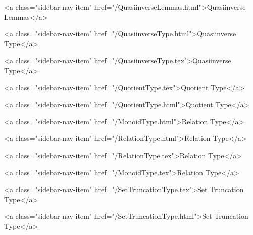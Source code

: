       
    
      
        
          <a class="sidebar-nav-item" href="/QuasiinverseLemmas.html">Quasiinverse Lemmas</a>
        
      
    
      
        
          <a class="sidebar-nav-item" href="/QuasiinverseType.html">Quasiinverse Type</a>
        
      
    
      
        
          <a class="sidebar-nav-item" href="/QuasiinverseType.tex">Quasiinverse Type</a>
        
      
    
      
        
          <a class="sidebar-nav-item" href="/QuotientType.tex">Quotient Type</a>
        
      
    
      
        
          <a class="sidebar-nav-item" href="/QuotientType.html">Quotient Type</a>
        
      
    
      
        
          <a class="sidebar-nav-item" href="/MonoidType.html">Relation Type</a>
        
      
    
      
        
          <a class="sidebar-nav-item" href="/RelationType.html">Relation Type</a>
        
      
    
      
        
          <a class="sidebar-nav-item" href="/RelationType.tex">Relation Type</a>
        
      
    
      
        
          <a class="sidebar-nav-item" href="/MonoidType.tex">Relation Type</a>
        
      
    
      
        
          <a class="sidebar-nav-item" href="/SetTruncationType.tex">Set Truncation Type</a>
        
      
    
      
        
          <a class="sidebar-nav-item" href="/SetTruncationType.html">Set Truncation Type</a>
        
